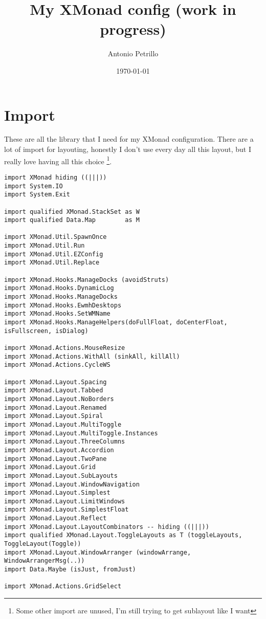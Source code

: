\documentclass[11pt]{article}
\author{Antonio Petrillo}
\date{\today}
\title{My XMonad config (work in progress)}
\begin{document}
\maketitle
\tableofcontents


\section{Import}
\label{sec:orgf116883}
These are all the library that I need for my XMonad configuration.
There are a lot of import for layouting, honestly I don't use every day all this layout,
but I really love having all this choice \footnote{Some other import are unused, I'm still trying to get sublayout like I want\label{org16a8ea1}}.
\begin{verbatim}
import XMonad hiding ((|||))
import System.IO
import System.Exit

import qualified XMonad.StackSet as W
import qualified Data.Map        as M

import XMonad.Util.SpawnOnce
import XMonad.Util.Run
import XMonad.Util.EZConfig
import XMonad.Util.Replace

import XMonad.Hooks.ManageDocks (avoidStruts)
import XMonad.Hooks.DynamicLog
import XMonad.Hooks.ManageDocks
import XMonad.Hooks.EwmhDesktops
import XMonad.Hooks.SetWMName
import XMonad.Hooks.ManageHelpers(doFullFloat, doCenterFloat, isFullscreen, isDialog)

import XMonad.Actions.MouseResize
import XMonad.Actions.WithAll (sinkAll, killAll)
import XMonad.Actions.CycleWS

import XMonad.Layout.Spacing
import XMonad.Layout.Tabbed 
import XMonad.Layout.NoBorders
import XMonad.Layout.Renamed
import XMonad.Layout.Spiral
import XMonad.Layout.MultiToggle
import XMonad.Layout.MultiToggle.Instances
import XMonad.Layout.ThreeColumns
import XMonad.Layout.Accordion
import XMonad.Layout.TwoPane
import XMonad.Layout.Grid
import XMonad.Layout.SubLayouts
import XMonad.Layout.WindowNavigation
import XMonad.Layout.Simplest
import XMonad.Layout.LimitWindows
import XMonad.Layout.SimplestFloat
import XMonad.Layout.Reflect
import XMonad.Layout.LayoutCombinators -- hiding ((|||))
import qualified XMonad.Layout.ToggleLayouts as T (toggleLayouts, ToggleLayout(Toggle))
import XMonad.Layout.WindowArranger (windowArrange, WindowArrangerMsg(..))
import Data.Maybe (isJust, fromJust)

import XMonad.Actions.GridSelect
\end{verbatim}
\end{document}
